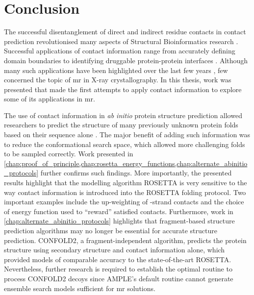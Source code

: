 \section{Conclusion}
The successful disentanglement of direct and indirect residue contacts in contact prediction revolutionised many aspects of Structural Bioinformatics research \cite{Simkovic2017-xs}. Successful applications of contact information range from accurately defining domain boundaries \cite{Sadowski2013-zu} to identifying druggable protein-protein interfaces \cite{Bai2016-sw}. Although many such applications have been highlighted over the last few years \cite{Simkovic2017-xs}, few concerned the topic of \gls{mr} in X-ray crystallography. In this thesis, work was presented that made the first attempts to apply contact information to explore some of its applications in \gls{mr}.

The use of contact information in \textit{ab initio} protein structure prediction allowed researchers to predict the structure of many previously unknown protein folds based on their sequence alone \cite[e.g.,][]{Marks2011-os,Michel2014-eg,Kosciolek2014-bt,Ovchinnikov2015-tn,Ovchinnikov2016-jj,Michel2017-xh,De_Oliveira2017-sg,Ovchinnikov2017-nd,Wang2017-rx}. The major benefit of adding such information was to reduce the conformational search space, which allowed more challenging folds to be sampled correctly. Work presented in \cref{chap:proof_of_principle,chap:rosetta_energy_functions,chap:alternate_abinitio_protocols} further confirms such findings. More importantly, the presented results highlight that the modelling algorithm ROSETTA is very sensitive to the way contact information is introduced into the ROSETTA folding protocol. Two important examples include the up-weighting of \textbeta-strand contacts and the choice of energy function used to ``reward'' satisfied contacts. Furthermore, work in \cref{chap:alternate_abinitio_protocols} highlights that fragment-based structure prediction algorithms may no longer be essential for accurate structure prediction. CONFOLD2, a fragment-independent algorithm, predicts the protein structure using secondary structure and contact information alone, which provided models of comparable accuracy to the state-of-the-art ROSETTA. Nevertheless, further research is required to establish the optimal routine to process CONFOLD2 decoys since AMPLE's default routine cannot generate ensemble search models sufficient for \gls{mr} solutions.

